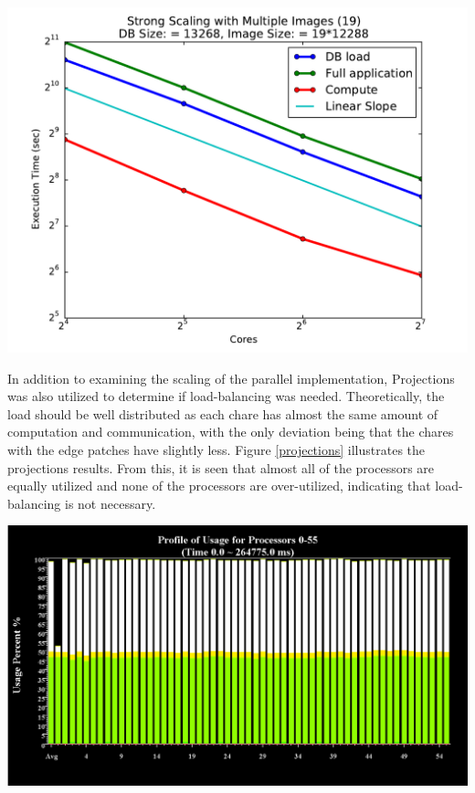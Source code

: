 \documentclass[a4paper]{article}
\begin{document}
\begin{center}
\includegraphics[scale=.4]{figs/13268_19_12288}
\label{scale_multi}
\end{center}

In addition to examining the scaling of the parallel implementation, Projections was also utilized to determine if load-balancing was needed.  Theoretically, the load should be well distributed as each chare has almost the same amount of computation and communication, with the only deviation being that the chares with the edge patches have slightly less.  Figure \ref{projections} illustrates the projections results.  From this, it is seen that almost all of the processors are equally utilized and none of the processors are over-utilized, indicating that load-balancing is not necessary.

\begin{center}
\includegraphics[scale=.4]{figs/projections_results}
\label{projections}
\end{center}
\end{document}
